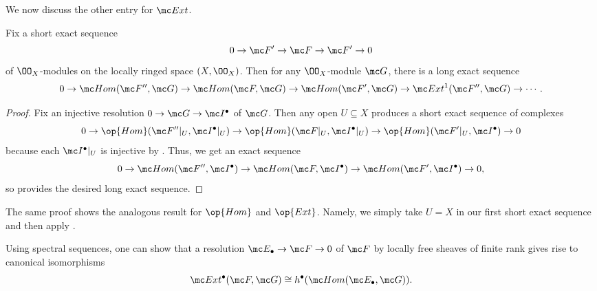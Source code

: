 \documentclass[../notes.tex]{subfiles}
\begin{document}
We now discuss the other entry for $\mc Ext$.
\begin{proposition}
	Fix a short exact sequence
	\[0\to\mc F'\to\mc F\to\mc F'\to0\]
	of $\OO_X$-modules on the locally ringed space $(X,\OO_X)$. Then for any $\OO_X$-module $\mc G$, there is a long exact sequence
	\[0\to\mc Hom(\mc F'',\mc G)\to\mc Hom(\mc F,\mc G)\to\mc Hom(\mc F',\mc G)\to\mc Ext^1(\mc F'',\mc G)\to\cdots.\]
\end{proposition}
\begin{proof}
	Fix an injective resolution $0\to\mc G\to\mc I^\bullet$ of $\mc G$. Then any open $U\subseteq X$ produces a short exact sequence of complexes
	\[0\to\op{Hom}(\mc F''|_U,\mc I^\bullet|_U)\to\op{Hom}(\mc F|_U,\mc I^\bullet|_U)\to\op{Hom}(\mc F'|_U,\mc I^\bullet)\to0\]
	because each $\mc I^\bullet|_U$ is injective by . Thus, we get an exact sequence
	\[0\to\mc Hom(\mc F'',\mc I^\bullet)\to\mc Hom(\mc F,\mc I^\bullet)\to\mc Hom(\mc F',\mc I^\bullet)\to0,\]
	so  provides the desired long exact sequence.
\end{proof}
\begin{remark}
	The same proof shows the analogous result for $\op{Hom}$ and $\op{Ext}$. Namely, we simply take $U=X$ in our first short exact sequence and then apply .
\end{remark}
\begin{remark} \label{rem:resolve-for-left-ext}
	Using spectral sequences, one can show that a resolution $\mc E_\bullet\to\mc F\to0$ of $\mc F$ by locally free sheaves of finite rank gives rise to canonical isomorphisms
	\[\mc Ext^\bullet(\mc F,\mc G)\cong h^\bullet(\mc Hom(\mc E_\bullet,\mc G)).\]
\end{remark}
\end{document}
